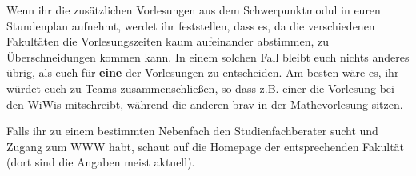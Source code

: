 Wenn ihr die zusätzlichen Vorlesungen aus dem Schwerpunktmodul in euren
  Stundenplan aufnehmt, werdet ihr feststellen, dass es, da die
  verschiedenen Fakultäten die Vorlesungszeiten kaum aufeinander
  abstimmen, zu Überschneidungen kommen kann.  In einem solchen Fall
  bleibt euch nichts anderes übrig, als euch für \textbf{eine} der
  Vorlesungen zu
  entscheiden.  Am besten wäre es, ihr würdet euch zu Teams
  zusammenschließen, so dass z.B. einer die Vorlesung bei den WiWis
  mitschreibt, während die anderen brav in der Mathevorlesung sitzen.

\pagebreak


Falls ihr zu einem bestimmten Nebenfach den Studienfachberater sucht
  und Zugang zum WWW habt, schaut auf die Homepage der entsprechenden Fakultät (dort sind die Angaben meist aktuell).
